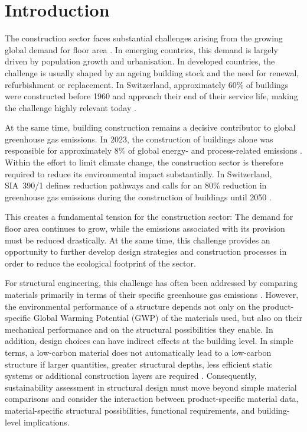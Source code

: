 \chapter{Introduction}\label{sec:introduction}

The construction sector faces substantial challenges arising from the growing global demand for floor area \cite{UNEP2025}. In emerging countries, this demand is largely driven by population growth and urbanisation. In developed countries, the challenge is usually shaped by an ageing building stock and the need for renewal, refurbishment or replacement. In Switzerland, approximately 60\% of buildings were constructed before 1960 and approach their end of their service life, making the challenge highly relevant today \cite{BFS2024_Bauperiode}.

At the same time, building construction remains a decisive contributor to global greenhouse gas emissions. In 2023, the construction of buildings alone was responsible for approximately 8\% of global energy- and process-related emissions \cite{UNEP2025}. Within the effort to limit climate change, the construction sector is therefore required to reduce its environmental impact substantially. In Switzerland, SIA~390/1 defines reduction pathways and calls for an 80\% reduction in greenhouse gas emissions during the construction of buildings until 2050 \cite{SIA390_1_2025}.

This creates a fundamental tension for the construction sector: The demand for floor area continues to grow, while the emissions associated with its provision must be reduced drastically. At the same time, this challenge provides an opportunity to further develop design strategies and construction processes in order to reduce the ecological footprint of the sector.

For structural engineering, this challenge has often been addressed by comparing materials primarily in terms of their specific greenhouse gas emissions \cite{Kaufmann2024_WhitePaper}. However, the environmental performance of a structure depends not only on the product-specific Global Warming Potential (GWP) of the materials used, but also on their mechanical performance and on the structural possibilities they enable. In addition, design choices can have indirect effects at the building level. In simple terms, a low-carbon material does not automatically lead to a low-carbon structure if larger quantities, greater structural depths, less efficient static systems or additional construction layers are required \cite{Kaufmann2024_WhitePaper}. Consequently, sustainability assessment in structural design must move beyond simple material comparisons and consider the interaction between product-specific material data, material-specific structural possibilities, functional requirements, and building-level implications.

